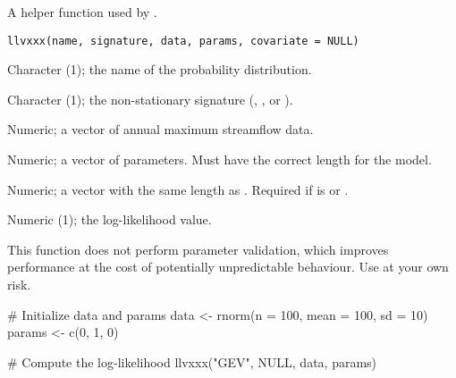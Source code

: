 \documentclass[a4paper]{book}
\begin{document}
%
\begin{Description}
A helper function used by .
\end{Description}
%
\begin{Usage}
\begin{verbatim}
llvxxx(name, signature, data, params, covariate = NULL)
\end{verbatim}
\end{Usage}
%
\begin{Arguments}
\begin{ldescription}
\item[\code{name}] Character (1); the name of the probability distribution.

\item[\code{signature}] Character (1); the non-stationary signature (, , or ).

\item[\code{data}] Numeric; a vector of annual maximum streamflow data.

\item[\code{params}] Numeric; a vector of parameters. Must have the correct length for the model.

\item[\code{covariate}] Numeric; a vector with the same length as .
Required if  is  or .
\end{ldescription}
\end{Arguments}
%
\begin{Value}
Numeric (1); the log-likelihood value.
\end{Value}
%
\begin{Note}
This function does not perform parameter validation, which improves performance
at the cost of potentially unpredictable behaviour. Use at your own risk.
\end{Note}
%
\begin{SeeAlso}
\end{SeeAlso}
%
\begin{Examples}
\begin{ExampleCode}
# Initialize data and params
data <- rnorm(n = 100, mean = 100, sd = 10)
params <- c(0, 1, 0)

# Compute the log-likelihood
llvxxx("GEV", NULL, data, params)

\end{ExampleCode}
\end{Examples}
\end{document}
